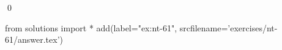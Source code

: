 
\begin{ex} 
  \label{ex:nt-61}
  
  \qed
\end{ex} 
\begin{python0}
from solutions import *
add(label="ex:nt-61",
    srcfilename='exercises/nt-61/answer.tex') 
\end{python0}
